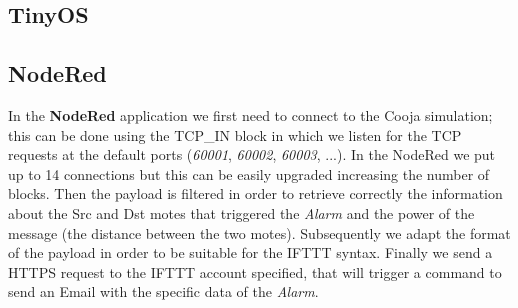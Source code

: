 
\subsection{TinyOS}

\subsection{NodeRed}

In the \textbf{NodeRed} application we first need to connect to the Cooja simulation;
this can be done using the TCP_IN block in which we listen for the TCP requests
at the default ports (\textit{60001}, \textit{60002}, \textit{60003}, ...).
In the NodeRed we put up to 14 connections but this can be easily upgraded
increasing the number of blocks.
Then the payload is filtered in order to retrieve correctly the information 
about the Src and Dst motes that triggered the \textit{Alarm} and the power of the message (the 
distance between the two motes).
Subsequently we adapt the format of the payload in order to be suitable for the 
IFTTT syntax.
Finally we send a HTTPS request to the IFTTT account specified, that will trigger a command
to send an Email with the specific data of the \textit{Alarm}.

